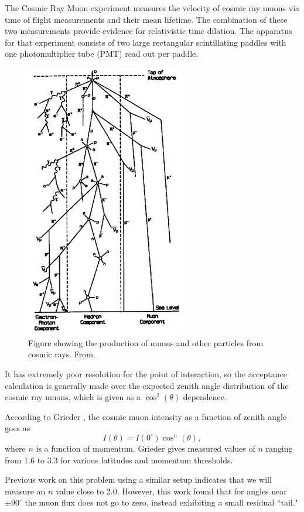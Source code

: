 The Cosmic Ray Muon experiment \cite{spatrick} measures the velocity of cosmic ray muons via time of flight measurements and their mean lifetime. The combination of these two measurements provide evidence for relativistic time dilation. The apparatus for that experiment consists of two large rectangular scintillating paddles with one photomultiplier tube (PMT) read out per paddle. 

\begin{figure}[htb]
\includegraphics[width=7cm]{muon_shower.png}
\caption{Figure showing the production of muons and other particles from cosmic rays. From\cite{grieder}.}
\label{fig:muon_shower}
\end{figure}

It has extremely poor resolution for the point of interaction, so the acceptance calculation is generally made over the expected zenith angle distribution of the cosmic ray muons, which is given as a $\cos^2(\theta)$ dependence. 

According to Grieder \cite{grieder}, the cosmic muon intensity as a function of zenith angle goes as 
\begin{equation}
\label{eqn:cosn}
I(\theta)=I(0^\circ)\cos^{n}(\theta),
\end{equation} 
where $n$ is a function of momentum. Grieder gives measured values of $n$ ranging from 1.6 to 3.3 for various latitudes and momentum thresholds.

Previous work on this problem using a similar setup \cite{kuo} indicates that we will measure an $n$ value close to 2.0. However, this work found that for angles near $\pm90^\circ$ the muon flux does not go to zero, instead exhibiting a small residual ``tail." 

